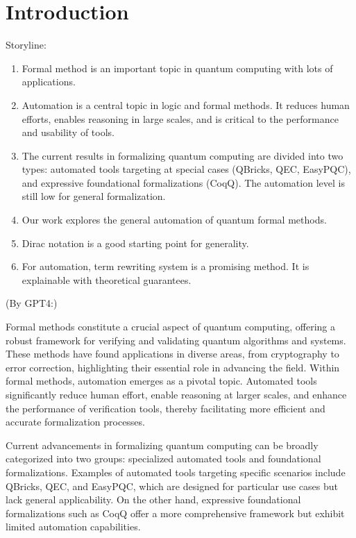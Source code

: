 
\section{Introduction}
Storyline:
\begin{enumerate}
    \item Formal method is an important topic in quantum computing with lots of applications.
    \item Automation is a central topic in logic and formal methods. It reduces human efforts, enables reasoning in large scales, and is critical to the performance and usability of tools.
    \item The current results in formalizing quantum computing are divided into two types: automated tools targeting at special cases (QBricks, QEC, EasyPQC), and expressive foundational formalizations (CoqQ). The automation level is still low for general formalization.
    \item Our work explores the general automation of quantum formal methods.
    \item Dirac notation is a good starting point for generality.
    \item For automation, term rewriting system is a promising method. It is explainable with theoretical guarantees.
\end{enumerate}


(By GPT4:)

Formal methods constitute a crucial aspect of quantum computing, offering a robust framework for verifying and validating quantum algorithms and systems. These methods have found applications in diverse areas, from cryptography to error correction, highlighting their essential role in advancing the field. Within formal methods, automation emerges as a pivotal topic. Automated tools significantly reduce human effort, enable reasoning at larger scales, and enhance the performance of verification tools, thereby facilitating more efficient and accurate formalization processes.

Current advancements in formalizing quantum computing can be broadly categorized into two groups: specialized automated tools and foundational formalizations. Examples of automated tools targeting specific scenarios include QBricks, QEC, and EasyPQC, which are designed for particular use cases but lack general applicability. On the other hand, expressive foundational formalizations such as CoqQ offer a more comprehensive framework but exhibit limited automation capabilities.

